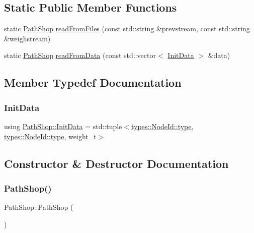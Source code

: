 \subsection*{Static Public Member Functions}
\begin{DoxyCompactItemize}
\item 
static \mbox{\hyperlink{class_path_shop}{Path\+Shop}} \mbox{\hyperlink{class_path_shop_a23fbe546bb0990d64c1f5c08d6432426}{read\+From\+Files}} (const std\+::string \&prevstream, const std\+::string \&weighstream)
\item 
static \mbox{\hyperlink{class_path_shop}{Path\+Shop}} \mbox{\hyperlink{class_path_shop_abdebf228fcd8d17fefe713ff934c17d9}{read\+From\+Data}} (const std\+::vector$<$ \mbox{\hyperlink{class_path_shop_a5b4a6b28d09367509e218e48128dbf11}{Init\+Data}} $>$ \&data)
\end{DoxyCompactItemize}


\subsection{Member Typedef Documentation}
\mbox{\label{class_path_shop_a5b4a6b28d09367509e218e48128dbf11}} 
\subsubsection{\texorpdfstring{InitData}{InitData}}
{\footnotesize\ttfamily using \mbox{\hyperlink{class_path_shop_a5b4a6b28d09367509e218e48128dbf11}{Path\+Shop\+::\+Init\+Data}} =  std\+::tuple$<$\mbox{\hyperlink{classtypes_1_1_id_a3460149759853c50fa31ad199e73419a}{types\+::\+Node\+Id\+::type}}, \mbox{\hyperlink{classtypes_1_1_id_a3460149759853c50fa31ad199e73419a}{types\+::\+Node\+Id\+::type}}, weight\+\_\+t$>$}



\subsection{Constructor \& Destructor Documentation}
\mbox{\label{class_path_shop_a3272ce71ec3fe02ff46dc3e4c5feef09}} 
\subsubsection{\texorpdfstring{PathShop()}{PathShop()}}
{\footnotesize\ttfamily Path\+Shop\+::\+Path\+Shop (\begin{DoxyParamCaption}{ }\end{DoxyParamCaption})}

